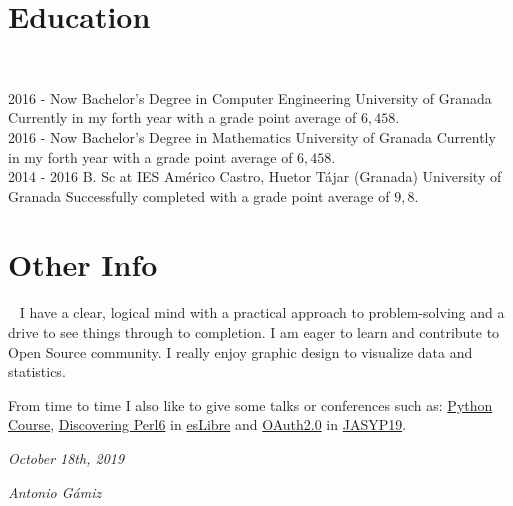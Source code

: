 \documentclass[]{friggeri-cv}
\begin{document}
\section{Education}
~
\begin{entrylist}
  \entry
    {2016 - Now}
    {Bachelor's Degree in Computer Engineering}
    {University of Granada}
    {Currently in my forth year with a grade point average of $6,458$.\\}
  \entry    
    {2016 - Now}
    {Bachelor's Degree in Mathematics}
    {University of Granada}
    {Currently in my forth year with a grade point average of $6,458$.\\}
  \entry    
    {2014 - 2016}
    {B. Sc at IES Américo Castro, Huetor Tájar (Granada)}
    {University of Granada}
    {Successfully completed with a grade point average of $9,8$.\\}
\end{entrylist}
\section{Other Info}
~
I have a clear, logical mind with a practical approach to problem-solving and a drive to see things through to completion. I am eager to learn and contribute to Open Source community. I  really enjoy graphic design to visualize data and statistics.

From time to time I also like to give some talks or conferences such as: \href{https://github.com/antoniogamiz/Curso-Python}{Python Course}, \href{https://github.com/antoniogamiz/discovering-perl6-talk}{Discovering Perl6} in \href{https://eslib.re/2019/}{esLibre} and \href{https://github.com/antoniogamiz/oauth-talk-jasyp-2019}{OAuth2.0} in \href{https://interferencias.tech/jasyp/}{JASYP19}.

\begin{flushleft}
\emph{October 18th, 2019}
\end{flushleft}
\begin{flushright}
\emph{Antonio Gámiz}
\end{flushright}
\end{document}
